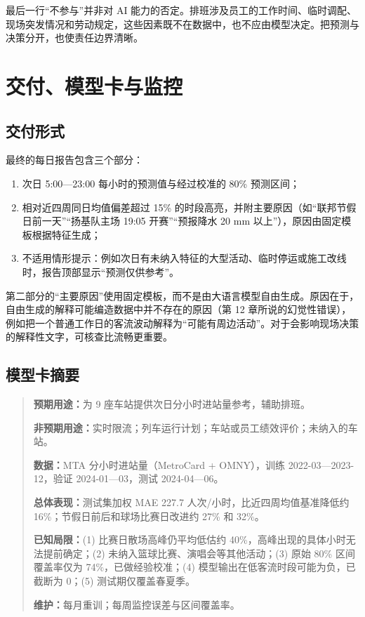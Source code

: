 最后一行“不参与”并非对 AI 能力的否定。排班涉及员工的工作时间、临时调配、现场突发情况和劳动规定，这些因素既不在数据中，也不应由模型决定。把预测与决策分开，也使责任边界清晰。

\section{交付、模型卡与监控}

\subsection{交付形式}

最终的每日报告包含三个部分：

\begin{enumerate}
  \item 次日 5:00—23:00 每小时的预测值与经过校准的 80\% 预测区间；
  \item 相对近四周同日均值偏差超过 15\% 的时段高亮，并附主要原因（如“联邦节假日前一天”“扬基队主场 19:05 开赛”“预报降水 20 mm 以上”），原因由固定模板根据特征生成；
  \item 不适用情形提示：例如次日有未纳入特征的大型活动、临时停运或施工改线时，报告顶部显示“预测仅供参考”。
\end{enumerate}

第二部分的“主要原因”使用固定模板，而不是由大语言模型自由生成。原因在于，自由生成的解释可能编造数据中并不存在的原因（第 12 章所说的幻觉性错误），例如把一个普通工作日的客流波动解释为“可能有周边活动”。对于会影响现场决策的解释性文字，可核查比流畅更重要。

\subsection{模型卡摘要}

\begin{quote}
\textbf{预期用途：}为 9 座车站提供次日分小时进站量参考，辅助排班。

\textbf{非预期用途：}实时限流；列车运行计划；车站或员工绩效评价；未纳入的车站。

\textbf{数据：}MTA 分小时进站量（MetroCard + OMNY），训练 2022-03—2023-12，验证 2024-01—03，测试 2024-04—06。

\textbf{总体表现：}测试集加权 MAE 227.7 人次/小时，比近四周均值基准降低约 16\%；节假日前后和球场比赛日改进约 27\% 和 32\%。

\textbf{已知局限：}(1) 比赛日散场高峰仍平均低估约 40\%，高峰出现的具体小时无法提前确定；(2) 未纳入篮球比赛、演唱会等其他活动；(3) 原始 80\% 区间覆盖率仅为 74\%，已做经验校准；(4) 模型输出在低客流时段可能为负，已截断为 0；(5) 测试期仅覆盖春夏季。

\textbf{维护：}每月重训；每周监控误差与区间覆盖率。
\end{quote}


